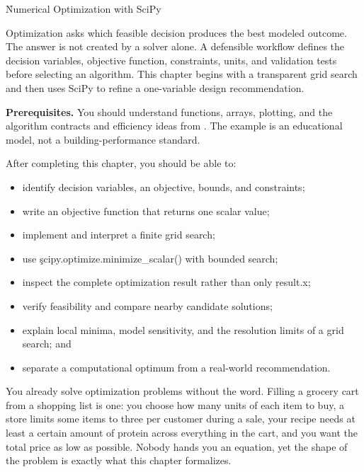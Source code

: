 
\h{Numerical Optimization with SciPy}
\label{ch:18}

Optimization asks which feasible decision produces the best modeled outcome.
The answer is not created by a solver alone. A defensible workflow defines the
decision variables, objective function, constraints, units, and validation
tests before selecting an algorithm. This chapter begins with a transparent
grid search and then uses SciPy to refine a one-variable design recommendation.

\begin{NoteBox}
\textbf{Prerequisites.} You should understand functions, arrays, plotting, and
the algorithm contracts and efficiency ideas from .
The example is an educational model, not a building-performance standard.
\end{NoteBox}

\begin{tcolorbox}[title=Learning outcomes,colframe=orange,colback=white,arc=2mm]
After completing this chapter, you should be able to:
\begin{itemize}
    \item identify decision variables, an objective, bounds, and constraints;
    \item write an objective function that returns one scalar value;
    \item implement and interpret a finite grid search;
    \item use \c{scipy.optimize.minimize_scalar()} with bounded search;
    \item inspect the complete optimization result rather than only \c{result.x};
    \item verify feasibility and compare nearby candidate solutions;
    \item explain local minima, model sensitivity, and the resolution limits of a grid search; and
    \item separate a computational optimum from a real-world recommendation.
\end{itemize}
\end{tcolorbox}


You already solve optimization problems without the word. Filling a grocery
cart from a shopping list is one: you choose how many units of each item to
buy, a store limits some items to three per customer during a sale, your
recipe needs at least a certain amount of protein across everything in the
cart, and you want the total price as low as possible. Nobody hands you an
equation, yet the shape of the problem is exactly what this chapter formalizes.

